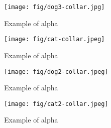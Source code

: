 \begin{frame}
  \begin{figure}
    \texttt{[image: fig/dog3-collar.jpg]}
    \caption{Example of alpha}
  \end{figure}
\end{frame}

\begin{frame}
  \begin{figure}
    \texttt{[image: fig/cat-collar.jpeg]}
    \caption{Example of alpha}
  \end{figure}
\end{frame}

\begin{frame}
  \begin{figure}
    \texttt{[image: fig/dog2-collar.jpeg]}
    \caption{Example of alpha}
  \end{figure}
\end{frame}

\begin{frame}
  \begin{figure}
    \texttt{[image: fig/cat2-collar.jpeg]}
    \caption{Example of alpha}
  \end{figure}
\end{frame}
